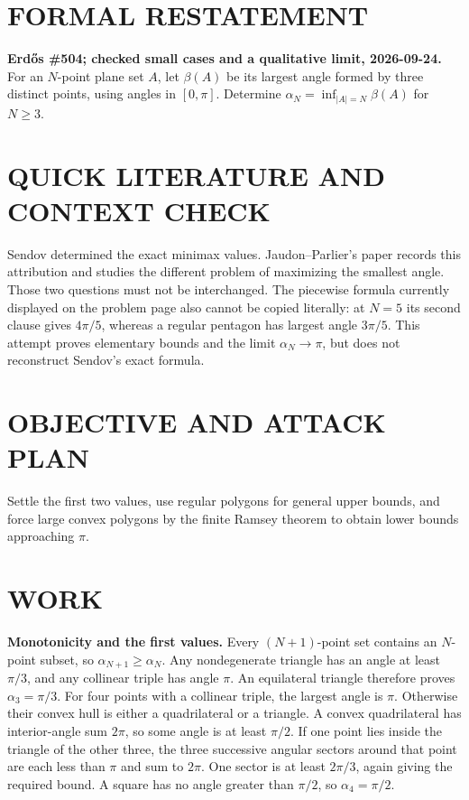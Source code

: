 \section{FORMAL RESTATEMENT}
\textbf{Erd\H{o}s \#504; checked small cases and a qualitative limit, 2026-09-24.}
For an $N$-point plane set $A$, let $\beta(A)$ be its largest angle formed by three distinct points, using angles in $[0,\pi]$. Determine
$\alpha_N=\inf_{|A|=N}\beta(A)$ for $N\geq3$.

\section{QUICK LITERATURE AND CONTEXT CHECK}
Sendov determined the exact minimax values. Jaudon--Parlier's paper records this attribution and studies the different problem of maximizing the smallest angle. Those two questions must not be interchanged. The piecewise formula currently displayed on the problem page also cannot be copied literally: at $N=5$ its second clause gives $4\pi/5$, whereas a regular pentagon has largest angle $3\pi/5$. This attempt proves elementary bounds and the limit $\alpha_N\to\pi$, but does not reconstruct Sendov's exact formula.

\section{OBJECTIVE AND ATTACK PLAN}
Settle the first two values, use regular polygons for general upper bounds, and force large convex polygons by the finite Ramsey theorem to obtain lower bounds approaching $\pi$.

\section{WORK}
\textbf{Monotonicity and the first values.} Every $(N+1)$-point set contains an $N$-point subset, so $\alpha_{N+1}\geq\alpha_N$. Any nondegenerate triangle has an angle at least $\pi/3$, and any collinear triple has angle $\pi$. An equilateral triangle therefore proves $\alpha_3=\pi/3$.
For four points with a collinear triple, the largest angle is $\pi$. Otherwise their convex hull is either a quadrilateral or a triangle. A convex quadrilateral has interior-angle sum $2\pi$, so some angle is at least $\pi/2$. If one point lies inside the triangle of the other three, the three successive angular sectors around that point are each less than $\pi$ and sum to $2\pi$. One sector is at least $2\pi/3$, again giving the required bound. A square has no angle greater than $\pi/2$, so $\alpha_4=\pi/2$.

